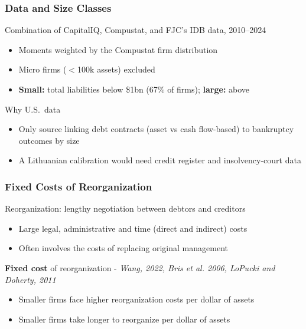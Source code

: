 \documentclass[aspectratio=169,xcolor=table]{beamer}
\begin{document}
\begin{frame}[label=targets] \frametitle{Data and Size Classes \hfill \hyperlink{ModelFit}{}}

Combination of CapitalIQ, Compustat, and FJC's IDB data, 2010--2024 \vspace{3mm}
\begin{itemize} \small
    \item Moments weighted by the Compustat firm distribution
    \item Micro firms ($<$100k assets) excluded
    \item \textbf{Small:} total liabilities below \$1bn (67\% of firms); \textbf{large:} above
\end{itemize} \vspace{3mm}

Why U.S.\ data
\begin{itemize} \small
    \item Only source linking debt contracts (asset vs cash flow-based) to bankruptcy outcomes by size
    \item A Lithuanian calibration would need credit register and insolvency-court data
\end{itemize}

\end{frame}

\begin{frame}[label=FCreorg] \frametitle{Fixed Costs of Reorganization \hfill \hyperlink{evidence}{}}

Reorganization: lengthy negotiation between debtors and creditors
\begin{itemize} \small
    \item Large legal, administrative and time (direct and indirect) costs
    \item Often involves the costs of replacing original management
\end{itemize} \normalsize \vspace{8mm}

\textbf{Fixed cost} of reorganization - \footnotesize \textit{Wang, 2022, Bris et al. 2006, LoPucki and Doherty, 2011}
\begin{itemize} \small
    \item Smaller firms face higher reorganization costs per dollar of assets
    \item Smaller firms take longer to reorganize per dollar of assets
\end{itemize} \normalsize

\end{frame}
\end{document}
